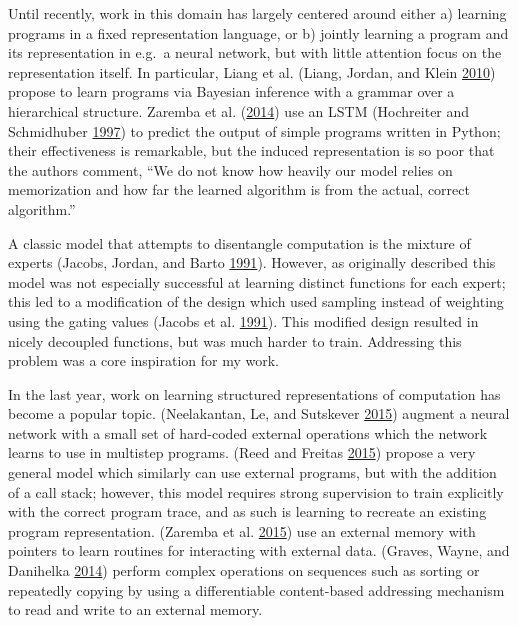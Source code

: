 \documentclass[12pt,twoside]{mitthesis}
\begin{document}
Until recently, work in this domain has largely centered around either
a) learning programs in a fixed representation language, or b) jointly
learning a program and its representation in e.g.~a neural network, but
with little attention focus on the representation itself. In particular,
Liang et al. (Liang, Jordan, and Klein
\protect\hyperlink{ref-liang2010learning}{2010}) propose to learn
programs via Bayesian inference with a grammar over a hierarchical
structure. Zaremba et al.
(\protect\hyperlink{ref-zaremba2014learning}{2014}) use an LSTM
(Hochreiter and Schmidhuber
\protect\hyperlink{ref-hochreiter1997long}{1997}) to predict the output
of simple programs written in Python; their effectiveness is remarkable,
but the induced representation is so poor that the authors comment, ``We
do not know how heavily our model relies on memorization and how far the
learned algorithm is from the actual, correct algorithm.''

A classic model that attempts to disentangle computation is the mixture
of experts (Jacobs, Jordan, and Barto
\protect\hyperlink{ref-jacobs1991task}{1991}). However, as originally
described this model was not especially successful at learning distinct
functions for each expert; this led to a modification of the design
which used sampling instead of weighting using the gating values (Jacobs
et al. \protect\hyperlink{ref-jacobs1991adaptive}{1991}). This modified
design resulted in nicely decoupled functions, but was much harder to
train. Addressing this problem was a core inspiration for my work.

In the last year, work on learning structured representations of
computation has become a popular topic. (Neelakantan, Le, and Sutskever
\protect\hyperlink{ref-neelakantan2015neural}{2015}) augment a neural
network with a small set of hard-coded external operations which the
network learns to use in multistep programs. (Reed and Freitas
\protect\hyperlink{ref-reed2015neural}{2015}) propose a very general
model which similarly can use external programs, but with the addition
of a call stack; however, this model requires strong supervision to
train explicitly with the correct program trace, and as such is learning
to recreate an existing program representation. (Zaremba et al.
\protect\hyperlink{ref-zaremba2015learning}{2015}) use an external
memory with pointers to learn routines for interacting with external
data. (Graves, Wayne, and Danihelka
\protect\hyperlink{ref-graves2014neural}{2014}) perform complex
operations on sequences such as sorting or repeatedly copying by using a
differentiable content-based addressing mechanism to read and write to
an external memory.
\end{document}
